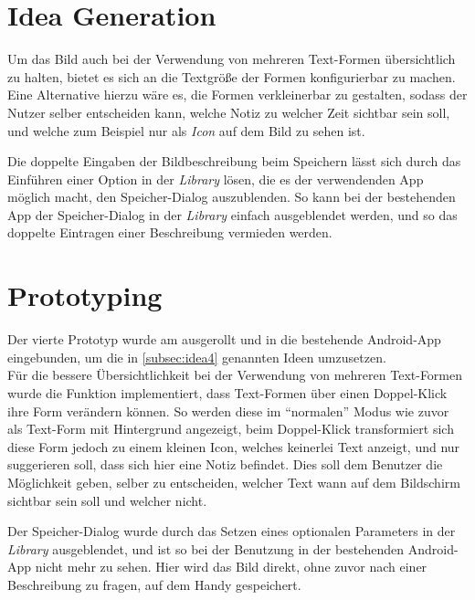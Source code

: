 \section{Idea Generation}\label{subsec:idea4}
Um das Bild auch bei der Verwendung von mehreren Text-Formen übersichtlich zu halten, bietet es sich an die Textgröße der Formen konfigurierbar zu machen.
Eine Alternative hierzu wäre es, die Formen verkleinerbar zu gestalten, sodass der Nutzer selber entscheiden kann, welche Notiz zu welcher Zeit sichtbar sein soll, und welche zum Beispiel nur als \emph{Icon} auf dem Bild zu sehen ist. \\

Die doppelte Eingaben der Bildbeschreibung beim Speichern lässt sich durch das Einführen einer Option in der \emph{Library} lösen, die es der verwendenden App möglich macht, den Speicher-Dialog auszublenden.
So kann bei der bestehenden App der Speicher-Dialog in der \emph{Library} einfach ausgeblendet werden, und so das doppelte Eintragen einer Beschreibung vermieden werden. \\

\section{Prototyping}
Der vierte Prototyp wurde am  ausgerollt und in die bestehende Android-App eingebunden, um die in \autoref{subsec:idea4} genannten Ideen umzusetzen. \\

Für die bessere Übersichtlichkeit bei der Verwendung von mehreren Text-Formen wurde die Funktion implementiert, dass Text-Formen über einen Doppel-Klick ihre Form verändern können.
So werden diese im ``normalen'' Modus wie zuvor als Text-Form mit Hintergrund angezeigt, beim Doppel-Klick transformiert sich diese Form jedoch zu einem kleinen Icon, welches keinerlei Text anzeigt, und nur suggerieren soll, dass sich hier eine Notiz befindet. 
Dies soll dem Benutzer die Möglichkeit geben, selber zu entscheiden, welcher Text wann auf dem Bildschirm sichtbar sein soll und welcher nicht. \\

Der Speicher-Dialog wurde durch das Setzen eines optionalen Parameters in der \emph{Library} ausgeblendet, und ist so bei der Benutzung in der bestehenden Android-App nicht mehr zu sehen.
Hier wird das Bild direkt, ohne zuvor nach einer Beschreibung zu fragen, auf dem Handy gespeichert. \\


